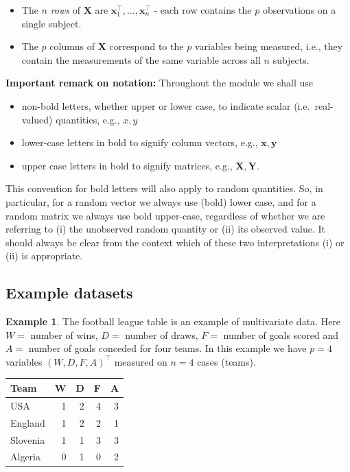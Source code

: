 \documentclass[]{book}
\providecommand{\tightlist}{%
  \setlength{\itemsep}{0pt}\setlength{\parskip}{0pt}}
\theoremstyle{definition}
\theoremstyle{definition}
\newtheorem{example}{Example}[chapter]
\theoremstyle{definition}
\theoremstyle{remark}
\begin{document}
\begin{itemize}
\tightlist
\item
  The \(n\) \emph{rows} of \(\mathbf X\) are \(\boldsymbol x_1^\top, \ldots , \boldsymbol x_n^\top\) - each row contains the \(p\) observations on a single subject.
\item
  The \(p\) columns of \(\mathbf X\) correspond to the \(p\) variables being measured, i.e., they contain the measurements of the same variable across all \(n\) subjects.
\end{itemize}

\textbf{Important remark on notation:} Throughout the module we shall use

\begin{itemize}
\tightlist
\item
  non-bold letters, whether upper or lower case, to indicate scalar (i.e.~real-valued) quantities, e.g., \(x, y\)
\item
  lower-case letters in bold to signify column vectors, e.g., \(\boldsymbol x, \boldsymbol y\)
\item
  upper case letters in bold to signify matrices, e.g., \(\boldsymbol X, \boldsymbol Y\).
\end{itemize}

This convention for bold letters will also apply to random quantities. So, in particular, for a random vector we always use (bold) lower case, and for a random matrix we always use bold upper-case, regardless of whether we are referring to (i) the unobserved random quantity or (ii) its observed value. It should always be clear from the context which of these two interpretations (i) or (ii) is appropriate.

\hypertarget{example-datasets}{%
\subsection{Example datasets}\label{example-datasets}}

\begin{example}
\protect\hypertarget{exm:football}{}{\label{exm:football} }The football league table is an example of multivariate data. Here \(W =\) number of wins, \(D =\) number of draws, \(F =\) number of goals scored and \(A =\) number of goals conceded for four teams.
In this example we have \(p=4\) variables \((W, D, F, A)^\top\) measured on \(n=4\) cases (teams).
\end{example}

\begin{table}[H]
\centering
\begin{tabular}{lrrrr}
\toprule
Team & W & D & F & A\\
\midrule
USA & 1 & 2 & 4 & 3\\
England & 1 & 2 & 2 & 1\\
Slovenia & 1 & 1 & 3 & 3\\
Algeria & 0 & 1 & 0 & 2\\
\bottomrule
\end{tabular}
\end{table}
\end{document}
